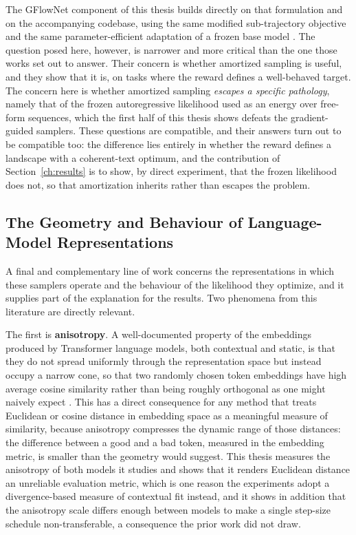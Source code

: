 The GFlowNet component of this thesis builds directly on that formulation and on the accompanying codebase, using the same modified sub-trajectory objective and the same parameter-efficient adaptation of a frozen base model \citep{hu2022lora}. The question posed here, however, is narrower and more critical than the one those works set out to answer. Their concern is whether amortized sampling is useful, and they show that it is, on tasks where the reward defines a well-behaved target. The concern here is whether amortized sampling \emph{escapes a specific pathology}, namely that of the frozen autoregressive likelihood used as an energy over free-form sequences, which the first half of this thesis shows defeats the gradient-guided samplers. These questions are compatible, and their answers turn out to be compatible too: the difference lies entirely in whether the reward defines a landscape with a coherent-text optimum, and the contribution of Section~\ref{ch:results} is to show, by direct experiment, that the frozen likelihood does not, so that amortization inherits rather than escapes the problem.

\subsection{The Geometry and Behaviour of Language-Model Representations}
\label{sec:rel-geometry}

A final and complementary line of work concerns the representations in which these samplers operate and the behaviour of the likelihood they optimize, and it supplies part of the explanation for the results. Two phenomena from this literature are directly relevant.

The first is \textbf{anisotropy}. A well-documented property of the embeddings produced by Transformer language models, both contextual and static, is that they do not spread uniformly through the representation space but instead occupy a narrow cone, so that two randomly chosen token embeddings have high average cosine similarity rather than being roughly orthogonal as one might naively expect \citep{gao2019representation, ethayarajh2019contextual}. This has a direct consequence for any method that treats Euclidean or cosine distance in embedding space as a meaningful measure of similarity, because anisotropy compresses the dynamic range of those distances: the difference between a good and a bad token, measured in the embedding metric, is smaller than the geometry would suggest. This thesis measures the anisotropy of both models it studies and shows that it renders Euclidean distance an unreliable evaluation metric, which is one reason the experiments adopt a divergence-based measure of contextual fit instead, and it shows in addition that the anisotropy scale differs enough between models to make a single step-size schedule non-transferable, a consequence the prior work did not draw.

